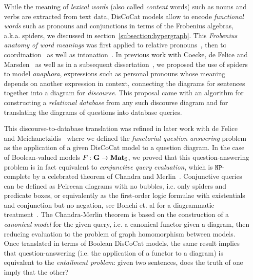 While the meaning of \emph{lexical words} (also called \emph{content} words) such as nouns and verbs are extracted from text data, DisCoCat models allow to encode \emph{functional words} such as pronouns and conjunctions in terms of the Frobenius algebras, a.k.a. spiders, we discussed in section~\ref{subsection:hypergraph}.
This \emph{Frobenius anatomy of word meanings} was first applied to relative pronouns~\cite{SadrzadehEtAl13,SadrzadehEtAl14}, then to coordination~\cite{Kartsaklis16} as well as intonation~\cite{KartsaklisSadrzadeh15}.
In previous work with Coecke, de Felice and Marsden~\cite{CoeckeEtAl18a} as well as in a subsequent dissertation~\cite{Toumi18a}, we proposed the use of spiders to model \emph{anaphora}, expressions such as personal pronouns whose meaning depends on another expression in context, connecting the diagrams for sentences together into a diagram for \emph{discourse}.
This proposal came with an algorithm for constructing a \emph{relational database} from any such discourse diagram and for translating the diagrams of questions into database queries.

This discourse-to-database translation was refined in later work with de Felice and Meichanetzidis~\cite{FeliceEtAl19} where we defined the \emph{functorial question answering} problem as the application of a given DisCoCat model to a question diagram.
In the case of Boolean-valued models $F : \mathbf{G} \to \mathbf{Mat}_{\mathbb{S}}$, we proved that this question-answering problem is in fact equivalent to \emph{conjunctive query evaluation}, which is $\mathtt{NP}$-complete by a celebrated theorem of Chandra and Merlin~\cite{ChandraMerlin77}.
Conjunctive queries can be defined as Peircean diagrams with no bubbles, i.e. only spiders and predicate boxes, or equivalently as the first-order logic formulae with existentials and conjunction but no negation, see Bonchi et. al for a diagrammatic treatment~\cite{BonchiEtAl18}.
The Chandra-Merlin theorem is based on the construction of a \emph{canonical model} for the given query, i.e. a canonical functor given a diagram, then reducing evaluation to the problem of graph homomorphism between models.
Once translated in terms of Boolean DisCoCat models, the same result implies that question-answering (i.e. the application of a functor to a diagram) is equivalent to the \emph{entailment problem}: given two sentences, does the truth of one imply that the other?

